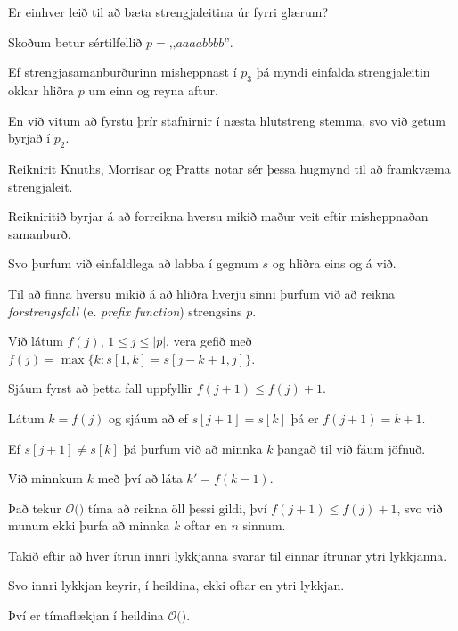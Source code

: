 {
	{
		\item<1-> Er einhver leið til að bæta strengjaleitina úr fyrri glærum?
		\item<2-> Skoðum betur sértilfellið $p = \text{,,}aaaabbbb\text{''}$.
		\item<3-> Ef strengjasamanburðurinn misheppnast í $p_3$ þá myndi einfalda strengjaleitin okkar hliðra $p$ um einn og reyna aftur.
		\item<4-> En við vitum að fyrstu þrír stafnirnir í næsta hlutstreng stemma, svo við getum byrjað í $p_2$.
		\item<5-> Reiknirit Knuths, Morrisar og Pratts notar sér þessa hugmynd til að framkvæma strengjaleit.
		\item<6-> Reikniritið byrjar á að forreikna hversu mikið maður veit eftir misheppnaðan samanburð.
		\item<7-> Svo þurfum við einfaldlega að labba í gegnum $s$ og hliðra eins og á við.
	}
}

{
	{
		\item<1-> Til að finna hversu mikið á að hliðra hverju sinni þurfum við að reikna \emph{forstrengsfall} (e. \emph{prefix function})
					strengsins $p$.
		\item<2-> Við látum $f(j)$, $1 \leq j \leq |p|$, vera gefið með $f(j) = \max\{k \colon s[1,k] = s[j - k + 1, j]\}$.
		\item<3-> Sjáum fyrst að þetta fall uppfyllir $f(j + 1) \leq f(j) + 1$.
		\item<4-> Látum $k = f(j)$ og sjáum að ef $s[j + 1] = s[k]$ þá er $f(j + 1) = k + 1$.
		\item<5-> Ef $s[j + 1] \neq s[k]$ þá þurfum við að minnka $k$ þangað til við fáum jöfnuð.
		\item<6-> Við minnkum $k$ með því að láta $k' = f(k - 1)$.
		\item<7-> Það tekur $\mathcal{O}($$)$ tíma að reikna öll þessi gildi,
					því $f(j + 1) \leq f(j) + 1$, svo við munum ekki þurfa að minnka $k$ oftar en $n$ sinnum.
	}
}

{
}

{
	{
		\item<1-> Takið eftir að hver ítrun innri lykkjanna svarar til einnar ítrunar ytri lykkjanna.
		\item<2-> Svo innri lykkjan keyrir, í heildina, ekki oftar en ytri lykkjan.
		\item<3-> Því er tímaflækjan í heildina $\mathcal{O}($\onslide<4->{$n + m$}$)$.
	}
}

